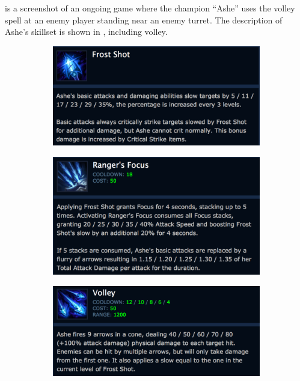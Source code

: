  is a screenshot of an ongoing game where the champion ``Ashe'' uses the volley spell at an enemy player standing near an enemy turret. The description of Ashe's skillset is shown in , including volley.

\begin{figure}
        \centering
        \begin{subfigure}[b]{0.3\textwidth}
                \includegraphics[width=\textwidth]{img/frostshot.png}
                \caption{}
                \label{fig:frostshot}
        \end{subfigure}
        \begin{subfigure}[b]{0.3\textwidth}
                \includegraphics[width=\textwidth]{img/rangersfocus.png}
                \caption{}
                \label{fig:rangersfocus}
        \end{subfigure}
        \begin{subfigure}[b]{0.3\textwidth}
                \includegraphics[width=\textwidth]{img/volley.png}

\end{subfigure}
\end{figure}
